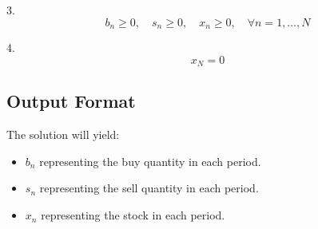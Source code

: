 \documentclass{article}
\begin{document}
3. 
\[
b_n \geq 0, \quad s_n \geq 0, \quad x_n \geq 0, \quad \forall n = 1, \ldots, N
\]

4. 
\[
x_N = 0
\]

\subsection*{Output Format}
The solution will yield:
\begin{itemize}
    \item $b_n$ representing the buy quantity in each period.
    \item $s_n$ representing the sell quantity in each period.
    \item $x_n$ representing the stock in each period.
\end{itemize}
\end{document}
